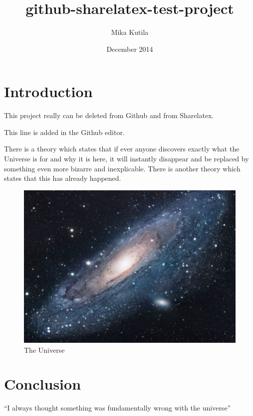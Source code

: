 \documentclass{article}
\title{github-sharelatex-test-project}
\author{Mika Kutila}
\date{December 2014}
\begin{document}
\maketitle

\section{Introduction}
This project really can be deleted from Github and from Sharelatex.

This line is added in the Github editor.

There is a theory which states that if ever anyone discovers exactly what the Universe is for and why it is here, it will instantly disappear and be replaced by something even more bizarre and inexplicable.
There is another theory which states that this has already happened.

\begin{figure}[h!]
\centering
\includegraphics[scale=1.7]{universe.jpg}
\caption{The Universe}
\label{fig:univerise}
\end{figure}

\section{Conclusion}
``I always thought something was fundamentally wrong with the universe'' \citep{adams1995hitchhiker}



\end{document}
